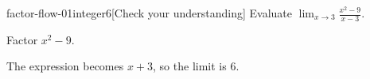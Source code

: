 \begin{bgcheck}{factor-flow-01}{integer}{6}[Check your understanding]
Evaluate \(\lim_{x\to3}\frac{x^2-9}{x-3}\).
\begin{bghint}
Factor \(x^2-9\).
\end{bghint}
\begin{bgreveal}
The expression becomes \(x+3\), so the limit is \(6\).
\end{bgreveal}
\end{bgcheck}

